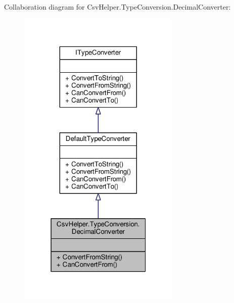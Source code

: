 Collaboration diagram for Csv\-Helper.\-Type\-Conversion.\-Decimal\-Converter\-:
\nopagebreak
\begin{figure}[H]
\begin{center}
\leavevmode
\includegraphics[width=220pt]{a00502}
\end{center}
\end{figure}
